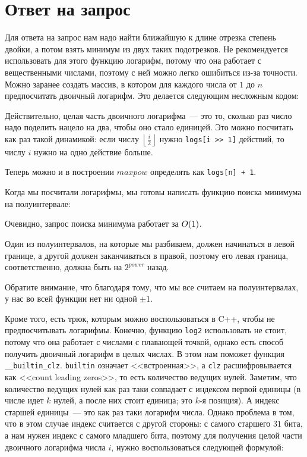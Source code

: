 \section{Ответ на запрос}

Для ответа на запрос нам надо найти ближайшую к длине отрезка степень двойки, а потом взять минимум из двух таких подотрезков. Не рекомендуется использовать для этого функцию логарифм, потому что она работает с вещественными числами, поэтому с ней можно легко ошибиться из-за точности. Можно заранее создать массив, в котором для каждого числа от $1$ до $n$ предпосчитать двоичный логарифм. Это делается следующим несложным кодом:



Действительно, целая часть двоичного логарифма~--- это то, сколько раз число надо поделить нацело на два, чтобы оно стало единицей. Это можно посчитать как раз такой динамикой: если числу $\left\lfloor \frac{i}{2} \right\rfloor$ нужно \verb+logs[i >> 1]+ действий, то числу $i$ нужно на одно действие больше.

Теперь можно и в построении $maxpow$ определять как \verb^logs[n] + 1^.

Когда мы посчитали логарифмы, мы готовы написать функцию поиска минимума на полуинтервале:



Очевидно, запрос поиска минимума работает за $O(1)$.

Один из полуинтервалов, на которые мы разбиваем, должен начинаться в левой границе, а другой должен заканчиваться в правой, поэтому его левая граница, соответственно, должна быть на $2^{power}$ назад.

Обратите внимание, что благодаря тому, что мы все считаем на полуинтервалах, у нас во всей функции нет ни одной $\pm 1$.

Кроме того, есть трюк, которым можно воспользоваться в C++, чтобы не предпосчитывать логарифмы. Конечно, функцию \verb+log2+ использовать не стоит, потому что она работает с числами с плавающей точкой, однако есть способ получить двоичный логарифм в целых числах. В этом нам поможет функция \verb+__builtin_clz+. \verb+builtin+ означает <<встроенная>>, а \verb+clz+ расшифровывается как <<count leading zeros>>, то есть количество ведущих нулей. Заметим, что количество ведущих нулей как раз таки совпадает с индексом первой единицы (в числе идет $k$ нулей, а после них стоит единица; это $k$-я позиция). А индекс старшей единицы~--- это как раз таки логарифм числа. Однако проблема в том, что в этом случае индекс считается с другой стороны: с самого старшего $31$ бита, а нам нужен индекс с самого младшего бита, поэтому для получения целой части двоичного логарифма числа $i$, нужно воспользоваться следующей формулой:

